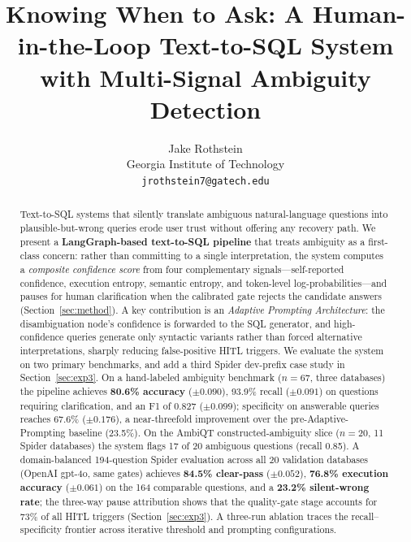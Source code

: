 \documentclass{article}
\title{Knowing When to Ask: A Human-in-the-Loop Text-to-SQL System\\
with Multi-Signal Ambiguity Detection}
\author{%
    Jake Rothstein\\   
    Georgia Institute of Technology\\   \texttt{jrothstein7@gatech.edu} }
\begin{document}
\maketitle

\begin{abstract}
Text-to-SQL systems that silently translate ambiguous natural-language questions
into plausible-but-wrong queries erode user trust without offering any recovery
path.
We present a \textbf{LangGraph-based text-to-SQL pipeline} that treats
ambiguity as a first-class concern: rather than committing to a single
interpretation, the system computes a \emph{composite confidence score} from
four complementary signals---self-reported confidence, execution entropy,
semantic entropy, and token-level log-probabilities---and pauses for human
clarification when the calibrated gate rejects the candidate answers
(Section~\ref{sec:method}).
A key contribution is an \emph{Adaptive Prompting Architecture}: the
disambiguation node's confidence is forwarded to the SQL generator, and
high-confidence queries generate only syntactic variants rather than forced
alternative interpretations, sharply reducing false-positive HITL triggers.
We evaluate the system on two primary benchmarks, and add a third Spider
dev-prefix case study in Section~\ref{sec:exp3}.
On a hand-labeled ambiguity benchmark ($n{=}67$, three databases) the pipeline
achieves \textbf{80.6\% accuracy} ($\pm 0.090$), 93.9\% recall ($\pm 0.091$) on questions requiring
clarification, and an F1 of 0.827 ($\pm 0.099$); specificity on answerable queries reaches
67.6\% ($\pm 0.176$), a near-threefold improvement over the pre-Adaptive-Prompting baseline
(23.5\%).
On the AmbiQT constructed-ambiguity slice ($n{=}20$, 11 Spider databases) the
system flags 17 of 20 ambiguous questions (recall 0.85).
A domain-balanced 194-question Spider evaluation across all 20 validation
databases (OpenAI gpt-4o, same gates) achieves
\textbf{84.5\% clear-pass} ($\pm 0.052$), \textbf{76.8\% execution accuracy}
($\pm 0.061$) on the 164 comparable questions, and a \textbf{23.2\%
silent-wrong rate}; the three-way pause attribution shows that the
quality-gate stage accounts for 73\% of all HITL triggers
(Section~\ref{sec:exp3}).
A three-run ablation traces the recall--specificity frontier across iterative
threshold and prompting configurations.
\end{abstract}

\end{document}
